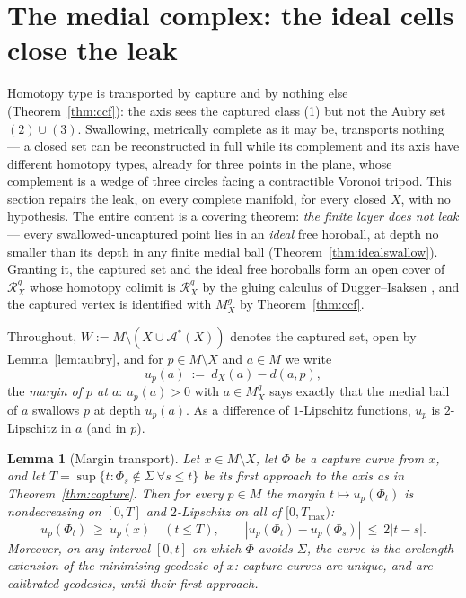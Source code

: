 \documentclass[11pt]{article}
\newtheorem{lemma}[theorem]{Lemma}
\theoremstyle{remark}
\newcommand{\X}{X}
\newcommand{\Mg}{M^{g}_{\X}}
\newcommand{\Rg}{\mathcal{R}^{g}_{\X}}
\newcommand{\dX}{d_{\X}}
\newcommand{\Aub}{\mathcal{A}^{\ast}}
\begin{document}
\section{The medial complex: the ideal cells close the leak}
\label{sec:complex}

Homotopy type is transported by capture and by nothing else
(Theorem~\ref{thm:ccf}): the axis sees the captured class (1) but not
the Aubry set $(2)\cup(3)$. Swallowing, metrically complete as it may
be, transports nothing --- a closed set can be reconstructed in full
while its complement and its axis have different homotopy types,
already for three points in the plane, whose complement is a wedge of
three circles facing a contractible Voronoi tripod. This section
repairs the leak, on every complete manifold, for every closed $\X$,
with no hypothesis. The entire content is a covering theorem:
\emph{the finite layer does not leak} --- every swallowed-uncaptured
point lies in an \emph{ideal} free horoball, at depth no smaller than
its depth in any finite medial ball (Theorem~\ref{thm:idealswallow}).
Granting it, the captured set and the ideal free horoballs form an
open cover of $\Rg$ whose homotopy colimit is $\Rg$ by the gluing
calculus of Dugger--Isaksen \cite{DI}, and the captured vertex is
identified with $\Mg$ by Theorem~\ref{thm:ccf}.

Throughout, $W:=M\setminus(\X\cup\Aub(\X))$ denotes the captured
set, open by Lemma~\ref{lem:aubry}, and for
$p\in M\setminus\X$ and $a\in M$ we write
\[
  u_{p}(a)\ :=\ \dX(a)-d(a,p),
\]
the \emph{margin of $p$ at $a$}: $u_{p}(a)>0$ with $a\in\Mg$ says
exactly that the medial ball of $a$ swallows $p$ at depth
$u_{p}(a)$. As a difference of $1$-Lipschitz functions, $u_{p}$ is
$2$-Lipschitz in $a$ (and in $p$).

\begin{lemma}[Margin transport]\label{lem:transport}
Let $x\in M\setminus\X$, let $\Phi$ be a capture curve from $x$, and
let $T=\sup\{t:\Phi_{s}\notin\Sigma\ \forall s\le t\}$ be its first
approach to the axis as in Theorem~\ref{thm:capture}. Then for every
$p\in M$ the margin $t\mapsto u_{p}(\Phi_{t})$ is nondecreasing on
$[0,T]$ and $2$-Lipschitz on all of $[0,T_{\max})$:
\[
  u_{p}(\Phi_{t})\ \ge\ u_{p}(x)\quad(t\le T),
  \qquad
  |u_{p}(\Phi_{t})-u_{p}(\Phi_{s})|\ \le\ 2|t-s| .
\]
Moreover, on any interval $[0,t]$ on which $\Phi$ avoids $\Sigma$,
the curve is the arclength extension of the minimising geodesic of
$x$: capture curves are unique, and are calibrated geodesics, until
their first approach.
\end{lemma}
\end{document}
